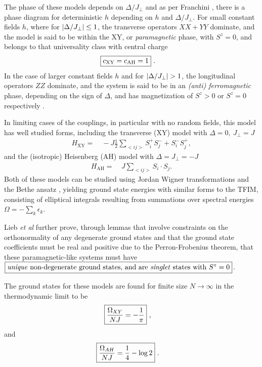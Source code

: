 \documentclass[12pt]{article}{}
\begin{document}
The phase of these models depends on  $\Delta/J_{\perp}$ and as per Franchini \cite{Franchini2016}, there is a phase diagram for deterministic $h$ depending on $h$ and $\Delta/J_{\perp}$. For small constant fields $h$, where for $\abs{\Delta/J_{\perp}} \leq 1$, the transverse operators $XX + YY$ dominate, and the model is said to be within the XY, or \emph{paramagnetic} phase, with $S^z = 0$, and belongs to that universality class with central charge
\begin{align}
  \Aboxed{c_{\textrm{XY}} = c_{\textrm{AH}} = 1}~.
\end{align}
In the case of larger constant fields $h$ and for $\abs{\Delta/J_{\perp}}>1$, the longitudinal operators $ZZ$ dominate, and the system is said to be in an \emph{(anti) ferromagnetic} phase, depending on the sign of $\Delta$, and has magnetization of $S^z >0$ or $S^z = 0$ respectively \cite{Franchini2016}.

In limiting cases of the couplings, in particular with no random fields, this model has well studied forms, including the transverse (XY) model with $\Delta = 0,~ J_{\perp} = J$
\begin{align}
  H_{\textrm{XY}} =&~ -J\frac{1}{2}\sum_{<ij>} S^{+}_{i}S^{-}_{j} + S^{-}_{i}S^{+}_{j}, \label{eq:xy_hamiltonian}
\end{align}
and the (isotropic) Heisenberg (AH) model with $\Delta = J_{\perp} = -J$
\begin{align}
  H_{\textrm{AH}} =&~ J\sum_{<ij>} S_{i} \cdot S_{j}. \label{eq:ah_hamiltonian}
\end{align}
Both of these models can be studied using Jordan Wigner transformations and the Bethe ansatz \cite{Franchini2016}, yielding ground state energies with similar forms to the TFIM, consisting of elliptical integrals resulting from summations over spectral energies $\Omega = -\sum_{k} \epsilon_{k}$. 

Lieb \emph{et al}\cite{DeLeeuw2013} further prove, through lemmas that involve constraints on the orthonormality of any degenerate ground states and that the ground state coefficients must be real and positive due to the Perron-Frobenius theorem, that these paramagnetic-like systems must have $\boxed{\textrm{\emph{unique} non-degenerate ground states, and are \emph{singlet} states with } S^{z} = 0}$. 

The ground states for these models are found for finite size $N \to \infty$ in the thermodynamic limit to be
\begin{align}
  \Aboxed{\frac{\Omega_{XY}}{NJ} = -\frac{1}{\pi}}~, \label{eq:xy_groundenergy}
\end{align}
and
\begin{align}
  \Aboxed{\frac{\Omega_{AH}}{NJ} = \frac{1}{4} - \log2}~. \label{eq:ah_groundenergy}
\end{align}
\end{document}
